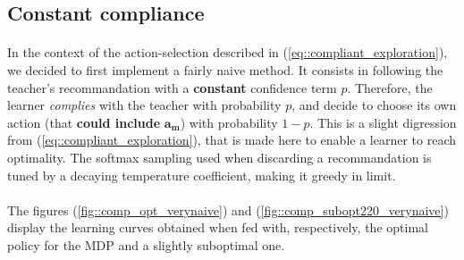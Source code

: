\documentclass[a4paper]{report}
\begin{document}
{{		\subsection{Constant compliance}
		{
			\paragraph{} In the context of the action-selection described in (\ref{eq::compliant_exploration}), we decided to first implement a fairly naive method. It consists in following the teacher's recommandation with a \textbf{constant} confidence term $p$. Therefore, the learner \emph{complies} with the teacher with probability $p$, and decide to choose its own action (that \textbf{could include} $\boldsymbol{a_m}$) with probability $1-p$. This is a slight digression from (\ref{eq::compliant_exploration}), that is made here to enable a learner to reach optimality. The softmax sampling used when discarding a recommandation is tuned by a decaying temperature coefficient, making it greedy in limit.
			
			\paragraph{} The figures (\ref{fig::comp_opt_verynaive}) and (\ref{fig::comp_subopt220_verynaive}) display the learning curves obtained when fed with, respectively, the optimal policy for the MDP and a slightly suboptimal one. 
			
}}}
\end{document}
